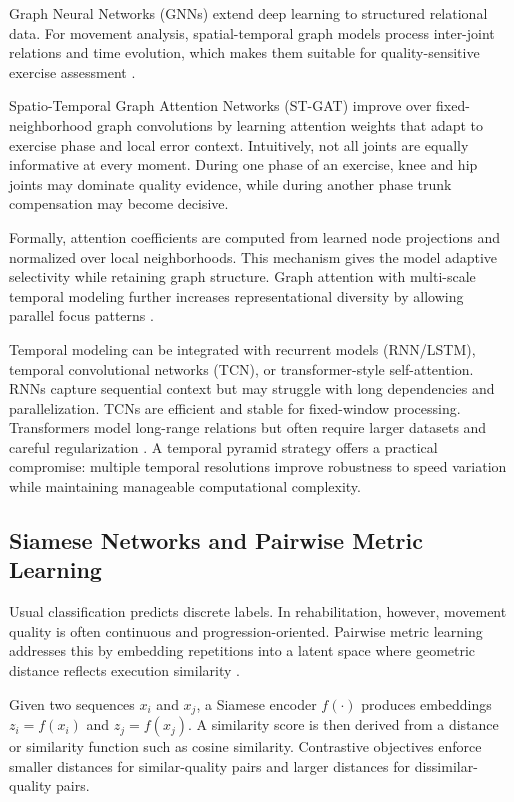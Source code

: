 Graph Neural Networks (GNNs) extend deep learning to structured relational data. For movement analysis, spatial-temporal graph models process inter-joint relations and time evolution, which makes them suitable for quality-sensitive exercise assessment \cite{CXJS22,GYDD18}.

Spatio-Temporal Graph Attention Networks (ST-GAT) improve over fixed-neighborhood graph convolutions by learning attention weights that adapt to exercise phase and local error context. Intuitively, not all joints are equally informative at every moment. During one phase of an exercise, knee and hip joints may dominate quality evidence, while during another phase trunk compensation may become decisive.

Formally, attention coefficients are computed from learned node projections and normalized over local neighborhoods. This mechanism gives the model adaptive selectivity while retaining graph structure. Graph attention with multi-scale temporal modeling further increases representational diversity by allowing parallel focus patterns \cite{CXJS22}.

Temporal modeling can be integrated with recurrent models (RNN/LSTM), temporal convolutional networks (TCN), or transformer-style self-attention. RNNs capture sequential context but may struggle with long dependencies and parallelization. TCNs are efficient and stable for fixed-window processing. Transformers model long-range relations but often require larger datasets and careful regularization \cite{CXJS22,GYDD18}. A temporal pyramid strategy offers a practical compromise: multiple temporal resolutions improve robustness to speed variation while maintaining manageable computational complexity.



\subsection{Siamese Networks and Pairwise Metric Learning}
\label{subsec:siamese-metric}

Usual classification predicts discrete labels. In rehabilitation, however, movement quality is often continuous and progression-oriented. Pairwise metric learning addresses this by embedding repetitions into a latent space where geometric distance reflects execution similarity \cite{BGL+93, HCL06, KZS15}.

Given two sequences $x_i$ and $x_j$, a Siamese encoder $f(\cdot)$ produces embeddings $z_i = f(x_i)$ and $z_j = f(x_j)$. A similarity score is then derived from a distance or similarity function such as cosine similarity. Contrastive objectives enforce smaller distances for similar-quality pairs and larger distances for dissimilar-quality pairs.

